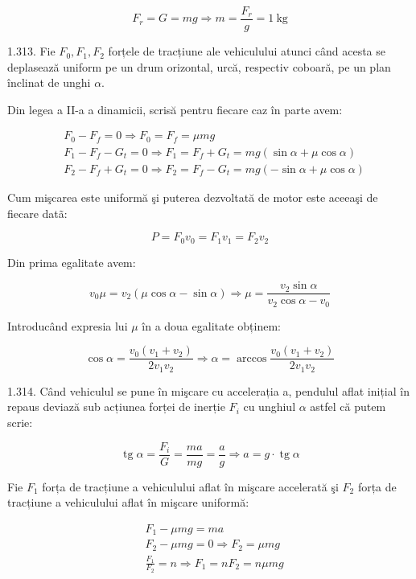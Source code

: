 \documentclass[10pt]{article}
\begin{document}
$$
F_{r}=G=m g \Rightarrow m=\frac{F_{r}}{g}=1 \mathrm{~kg}
$$

1.313. Fie $F_{0}, F_{1}, F_{2}$ forțele de tracțiune ale vehiculului atunci când acesta se deplasează uniform pe un drum orizontal, urcă, respectiv coboară, pe un plan înclinat de unghi $\alpha$.

Din legea a II-a a dinamicii, scrisă pentru fiecare caz în parte avem:

$$
\begin{aligned}
& F_{0}-F_{f}=0 \Rightarrow F_{0}=F_{f}=\mu m g \\
& F_{1}-F_{f}-G_{t}=0 \Rightarrow F_{1}=F_{f}+G_{t}=m g(\sin \alpha+\mu \cos \alpha) \\
& F_{2}-F_{f}+G_{t}=0 \Rightarrow F_{2}=F_{f}-G_{t}=m g(-\sin \alpha+\mu \cos \alpha)
\end{aligned}
$$

Cum mişcarea este uniformă şi puterea dezvoltată de motor este aceeaşi de fiecare datã:

$$
P=F_{0} v_{0}=F_{1} v_{1}=F_{2} v_{2}
$$

Din prima egalitate avem:

$$
v_{0} \mu=v_{2}(\mu \cos \alpha-\sin \alpha) \Rightarrow \mu=\frac{v_{2} \sin \alpha}{v_{2} \cos \alpha-v_{0}}
$$

Introducând expresia lui $\mu$ în a doua egalitate obținem:

$$
\cos \alpha=\frac{v_{0}\left(v_{1}+v_{2}\right)}{2 v_{1} v_{2}} \Rightarrow \alpha=\arccos \frac{v_{0}\left(v_{1}+v_{2}\right)}{2 v_{1} v_{2}}
$$

1.314. Când vehiculul se pune în mişcare cu accelerația a, pendulul aflat inițial în repaus deviază sub acțiunea forței de inerție $F_{i}$ cu unghiul $\alpha$ astfel că putem scrie:


\begin{equation*}
\operatorname{tg} \alpha=\frac{F_{i}}{G}=\frac{m a}{m g}=\frac{a}{g} \Rightarrow a=g \cdot \operatorname{tg} \alpha \tag{1}
\end{equation*}


Fie $F_{1}$ forța de tracțiune a vehiculului aflat în mişcare accelerată şi $F_{2}$ forța de tracțiune a vehiculului aflat în mişcare uniformă:


\begin{align*}
& F_{1}-\mu m g=m a  \tag{2}\\
& F_{2}-\mu m g=0 \Rightarrow F_{2}=\mu m g \\
& \frac{F_{1}}{F_{2}}=n \Rightarrow F_{1}=n F_{2}=n \mu m g
\end{align*}
\end{document}
